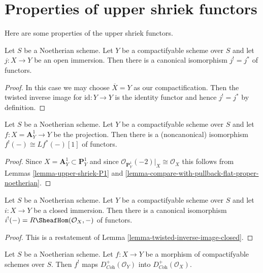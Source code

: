 \section{Properties of upper shriek functors}
\label{section-upper-shriek-properties}

\noindent
Here are some properties of the upper shriek functors.

\begin{lemma}
\label{lemma-shriek-open-immersion}
Let $S$ be a Noetherian scheme. Let $Y$ be a compactifyable
scheme over $S$ and let $j : X \to Y$ be an open immersion.
Then there is a canonical isomorphism $j^! = j^*$ of functors.
\end{lemma}

\begin{proof}
In this case we may choose $\overline{X} = Y$ as our compactification.
Then the twisted inverse image for $\text{id} : Y \to Y$ is the
identity functor and hence $j^! = j^*$ by definition.
\end{proof}

\begin{lemma}
\label{lemma-shriek-affine-line}
Let $S$ be a Noetherian scheme. Let $Y$ be a compactifyable
scheme over $S$ and let $f : X = \mathbf{A}^1_Y \to Y$ be
the projection. Then there is a (noncanonical) isomorphism
$f^!(-) \cong Lf^*(-) [1]$ of functors.
\end{lemma}

\begin{proof}
Since $X = \mathbf{A}^1_Y \subset \mathbf{P}^1_Y$
and since $\mathcal{O}_{\mathbf{P}^1_Y}(-2)|_X \cong \mathcal{O}_X$
this follows from Lemmas \ref{lemma-upper-shriek-P1} and
\ref{lemma-compare-with-pullback-flat-proper-noetherian}.
\end{proof}

\begin{lemma}
\label{lemma-shriek-closed-immersion}
Let $S$ be a Noetherian scheme. Let $Y$ be a compactifyable
scheme over $S$ and let $i : X \to Y$ be a closed immersion.
Then there is a canonical isomorphism
$i^!(-) = R\SheafHom(\mathcal{O}_X, -)$ of functors.
\end{lemma}

\begin{proof}
This is a restatement of Lemma \ref{lemma-twisted-inverse-image-closed}.
\end{proof}

\begin{lemma}
\label{lemma-shriek-coherent}
Let $S$ be a Noetherian scheme. Let $f : X \to Y$ be a morphism
of compactifyable schemes over $S$. Then $f^!$ maps
$D_{\textit{Coh}}^+(\mathcal{O}_Y)$ into $D_{\textit{Coh}}^+(\mathcal{O}_X)$.
\end{lemma}

